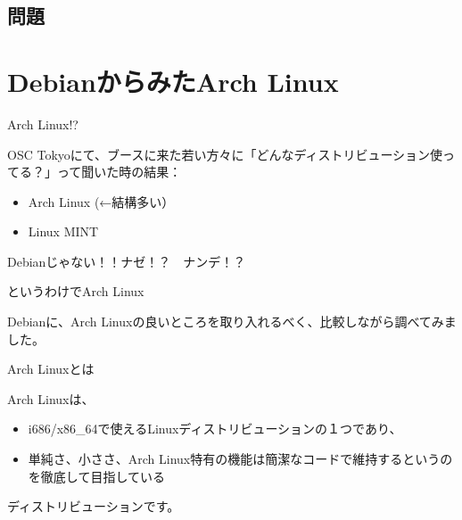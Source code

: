 \subsection{問題}



\section{DebianからみたArch Linux}

\begin{frame}{Arch Linux!?}

  OSC Tokyoにて、ブースに来た若い方々に「どんなディストリビューション使ってる？」って聞いた時の結果：

\begin{itemize}
 \item Arch Linux (←結構多い）
 \item Linux MINT
\end{itemize}

\begin{center}
{\LARGE Debianじゃない！！ナゼ！？　ナンデ！？}
\end{center}
\end{frame}

\begin{frame}{というわけでArch Linux}

 Debianに、Arch Linuxの良いところを取り入れるべく、比較しながら調べてみました。
  
\end{frame}

\begin{frame}{Arch Linuxとは}

  Arch Linuxは、
\begin{itemize}
\item i686/x86\_64で使えるLinuxディストリビューションの１つであり、
\item 単純さ、小ささ、Arch Linux特有の機能は簡潔なコードで維持するというのを徹底して目指している
\end{itemize}
ディストリビューションです。
\end{frame}


